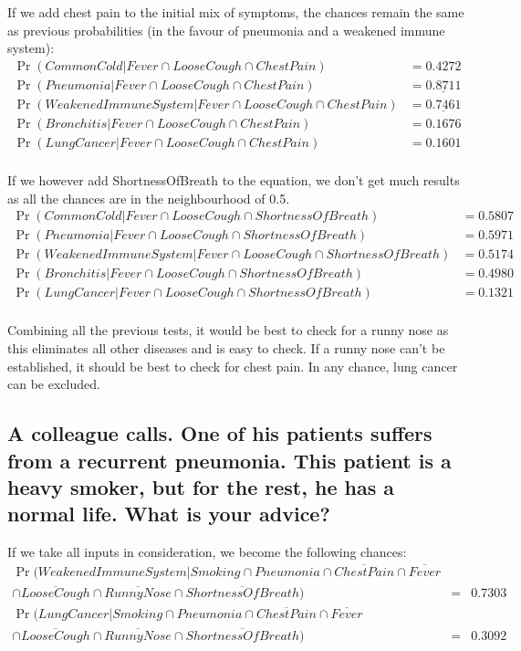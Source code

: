 \documentclass[12pt, a4paper]{article}
\begin{document}
If we add chest pain to the initial mix of symptoms, the chances remain the same as previous probabilities (in the favour of pneumonia and a weakened immune system):
\begin{align*}
\Pr(CommonCold | Fever \cap LooseCough \cap ChestPain) &= 0.4272 \\
\Pr(Pneumonia | Fever \cap LooseCough \cap ChestPain) &= \underline{0.8711} \\
\Pr(WeakenedImmuneSystem | Fever \cap LooseCough \cap ChestPain) &= \underline{0.7461} \\
\Pr(Bronchitis | Fever \cap LooseCough \cap ChestPain) &= 0.1676 \\
\Pr(LungCancer | Fever \cap LooseCough \cap ChestPain) &= 0.1601 \\
\end{align*}

If we however add ShortnessOfBreath to the equation, we don't get much results as all the chances are in the neighbourhood of 0.5.
\begin{align*}
\Pr(CommonCold | Fever \cap LooseCough \cap ShortnessOfBreath) &= 0.5807 \\
\Pr(Pneumonia | Fever \cap LooseCough \cap ShortnessOfBreath) &= 0.5971 \\
\Pr(WeakenedImmuneSystem | Fever \cap LooseCough \cap ShortnessOfBreath) &= 0.5174 \\
\Pr(Bronchitis | Fever \cap LooseCough \cap ShortnessOfBreath) &= 0.4980 \\
\Pr(LungCancer | Fever \cap LooseCough \cap ShortnessOfBreath) &= 0.1321 \\
\end{align*}

Combining all the previous tests, it would be best to check for a runny nose as this eliminates all other diseases and is easy to check. If a runny nose can't be established, it should be best to check for chest pain. In any chance, lung cancer can be excluded.


\subsection{A colleague calls. One of his patients suffers from a recurrent pneumonia. This patient is a heavy smoker, but for the rest, he has a normal life. What is your advice?}
If we take all inputs in consideration, we become the following chances:
\begin{align*}
\Pr(WeakenedImmuneSystem | Smoking \cap Pneumonia \cap \overline{ChestPain} \cap \overline{Fever} \\ \cap \overline{LooseCough} \cap \overline{RunnyNose} \cap \overline{ShortnessOfBreath}) &=& 0.7303 \\
\Pr(LungCancer | Smoking \cap Pneumonia \cap \overline{ChestPain} \cap \overline{Fever} \\ \cap \overline{LooseCough} \cap \overline{RunnyNose} \cap \overline{ShortnessOfBreath}) &=& 0.3092
\end{align*}
\end{document}

